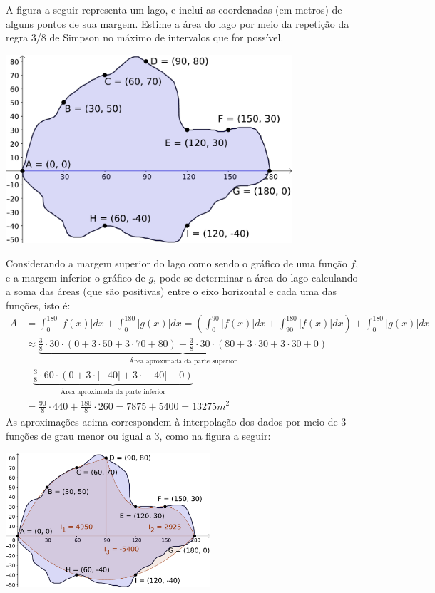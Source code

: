\documentclass[12pt,a4paper]{article}
\begin{document}
\begin{ExerciseList}
\Exercise[title={2,5}]
A figura a seguir representa um lago, e inclui as coordenadas (em metros) de alguns pontos de sua margem. Estime a área do lago por meio da repetição da regra 3/8 de Simpson no máximo de intervalos que for possível.
\begin{center}
\includegraphics[height=7.0cm]{img/prova-3-pro-1-lago.pdf}
\end{center}
\Answer Considerando a margem superior do lago como sendo o gráfico de uma função $f$, e a margem inferior o gráfico de $g$, pode-se determinar a área do lago calculando a soma das áreas (que são positivas) entre o eixo horizontal e cada uma das funções, isto é:
\begin{align*}
A & = \int_0^{180} |f(x)| dx + \int_0^{180} |g(x)| dx
    = \left( \int_0^{90} |f(x)| dx + \int_{90}^{180} |f(x)| dx \right)
    + \int_0^{180} |g(x)| dx\\
  & \approx
  \underbrace{
    \frac{3}{8} \cdot 30 \cdot (0 +3\cdot 50 +3\cdot 70+80)
  + \frac{3}{8} \cdot 30 \cdot (80+3\cdot 30 +3\cdot 30+ 0)
  }_{\text{Área aproximada da parte superior}}\\
& + \underbrace{
  \frac{3}{8} \cdot 60 \cdot
  (0+3\cdot |-40|+3\cdot |-40|+0)
  }_{\text{Área aproximada da parte inferior}}\\
&=  \frac{90}{8} \cdot 440 + \frac{180}{8}\cdot 260
 = 7875+5400 = 13275 m^2
\end{align*}
As aproximações acima correspondem à interpolação dos dados por meio de 3 funções de grau menor ou igual a 3, como na figura a seguir:
\begin{center}
\includegraphics[height=5.0cm]{img/prova-3-pro-1-lago-aprox.pdf}
\end{center}


\end{ExerciseList}
\end{document}
